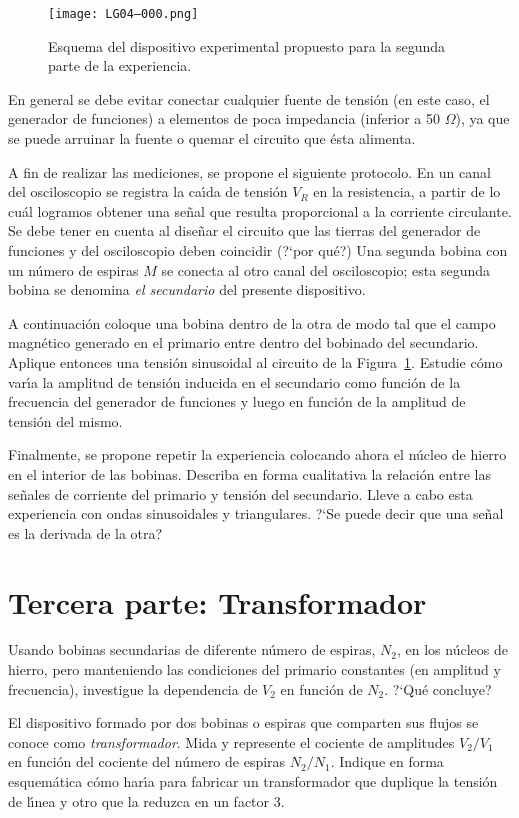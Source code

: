 \documentclass[laboratorio]{guia}
\begin{document}
\begin{figure}[t!]
    \centering
    \texttt{[image: LG04--000.png]}
    \caption{Esquema del dispositivo experimental propuesto para la segunda
    parte de la experiencia.}
    \label{fig:1}
\end{figure}

En general se debe evitar conectar cualquier fuente de tensi\'on (en este caso,
el generador de funciones) a elementos de poca impedancia (inferior a 50
$\Omega$), ya que se puede arruinar la fuente o quemar el circuito que \'esta
alimenta. 

A fin de realizar las mediciones, se propone el siguiente protocolo. En un
canal del osciloscopio se registra la ca\'\i da de tensi\'on $V_R$ en la
resistencia, a partir de lo cu\'al logramos obtener una se\~nal que resulta
proporcional a la corriente circulante. Se debe tener en cuenta al dise\~nar el
circuito que las tierras del generador de funciones y del osciloscopio deben
coincidir (?`por qu\'e?) Una segunda bobina con un n\'umero de espiras $M$ se conecta al otro canal del
osciloscopio; esta segunda bobina se denomina {\it el secundario} del presente
dispositivo.

A continuaci\'on coloque una bobina dentro de la otra de modo tal que el campo
magn\'etico generado en el primario entre dentro del bobinado del secundario.
Aplique entonces una tensi\'on sinusoidal al circuito de la Figura~\ref{fig:1}.
Estudie c\'omo var\'\i a la amplitud de tensi\'on inducida en el secundario
como funci\'on de la frecuencia del generador de funciones y luego en funci\'on
de la amplitud de tensi\'on del mismo.

Finalmente, se propone repetir la experiencia colocando ahora el n\'ucleo de
hierro en el interior de las bobinas. Describa en forma cualitativa la
relaci\'on entre las se\~nales de corriente del primario y tensi\'on del
secundario. Lleve a cabo esta experiencia con ondas sinusoidales y
triangulares. ?`Se puede decir que una se\~nal es la derivada de la otra?

\section{Tercera parte: Transformador}

Usando bobinas secundarias de diferente n\'umero de espiras, $N_2$, en los n\'ucleos de
hierro, pero manteniendo las condiciones del primario constantes (en amplitud y
frecuencia), investigue la dependencia de $V_2$ en funci\'on de $N_2$. ?`Qu\'e
concluye? 

El dispositivo formado por dos bobinas o espiras que comparten sus flujos se
conoce como {\it transformador}. Mida y represente el cociente de amplitudes
$V_2/V_1$ en funci\'on del cociente del n\'umero de espiras $N_2/N_1$. Indique
en forma esquem\'atica c\'omo har\'\i a para fabricar un transformador que
duplique la tensi\'on de l\'\i nea y otro que la reduzca en un factor 3. 

\nocite{Alonso1998,Purcell1988,Reitz1996,Trelles1984,Reitz1996}
 

\end{document}
